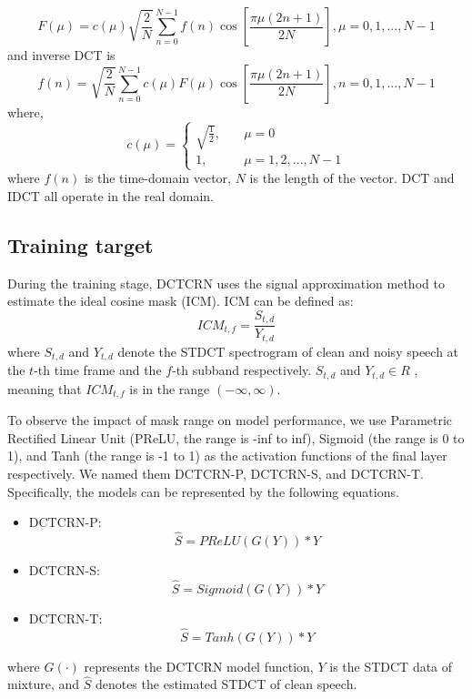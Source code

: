 \documentclass[journal,10pt]{IEEEtran}
\begin{document}
\begin{equation} \label{dct}
  F(\mu)=c(\mu)\sqrt{\frac 2 N} \sum_{n=0}^{N-1}f(n)\cos[\frac {\pi\mu(2n+1)} {2N}], \mu=0,1,...,N-1
\end{equation}
and inverse DCT is
\begin{equation} \label{idct}
  f(n)=\sqrt{\frac 2 N} \sum_{n=0}^{N-1}c(\mu)F(\mu)\cos[\frac {\pi\mu(2n+1)} {2N}], n=0,1,...,N-1
\end{equation}
where,
\begin{equation*}
  c(\mu)=\left\{
  \begin{aligned}
  \sqrt {\frac{1}{2}},\quad & \mu = 0 \\
  1                ,\quad & \mu = 1,2,...,N-1
  \end{aligned}
  \right.
\end{equation*}
where $f(n)$ is the time-domain vector, $N$ is the length of the vector. DCT and IDCT all operate in the real domain.

\subsection{Training target}

During the training stage, DCTCRN uses the signal approximation method to estimate the ideal cosine mask (ICM). ICM can be defined as:
\begin{equation}\label{icm}
ICM_{t,f}=\frac{S_{t,d}}{Y_{t,d}}
\end{equation}
where $S_{t,d}$ and $Y_{t,d}$ denote the STDCT spectrogram of clean and noisy speech at the $t$-th time frame and the $f$-th subband respectively. $S_{t,d}$ and $Y_{t,d} \in R$ , meaning that $ICM_{t,f}$ is in the range $(-\infty,\infty)$.

To observe the impact of mask range on model performance, we use Parametric Rectified Linear Unit (PReLU, the range is -inf to inf), Sigmoid (the range is 0 to 1), and Tanh (the range is -1 to 1) as the activation functions of the final layer respectively. We named them DCTCRN-P, DCTCRN-S, and DCTCRN-T. Specifically, the models can be represented by the following equations.

\begin{itemize}
\item DCTCRN-P:
\begin{equation}\label{icmp}
\widehat{S} = PReLU(G(Y)) * Y
\end{equation}
\item DCTCRN-S:
\begin{equation}\label{icms}
\widehat{S} = Sigmoid(G(Y)) * Y
\end{equation}
\item DCTCRN-T:
\begin{equation}\label{icmt}
\widehat{S} = Tanh(G(Y)) * Y
\end{equation}
\end{itemize}
where $G(\cdot)$ represents the DCTCRN model function, $Y$ is the STDCT data of mixture, and $\widehat{S}$ denotes the estimated STDCT of clean speech.
\end{document}

